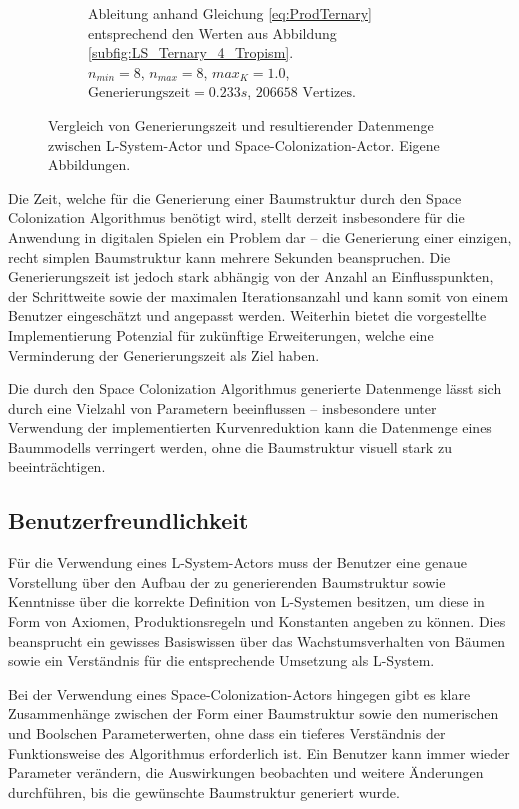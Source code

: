 \begin{figure} [hbtp]
\begin{subfigure}[t]{.5\textwidth}
		\caption{Ableitung anhand Gleichung \ref{eq:ProdTernary} entsprechend den Werten aus Abbildung \ref{subfig:LS_Ternary_4_Tropism}. \\ $n_{min} = 8$, $n_{max} = 8$, $max_K = 1.0$, \\ $\text{Generierungszeit}= 0.233s$, $206658 \text{ Vertizes}$.}
		\label{subfig:Performance_LS_Ternary_4_Tropism}
	\end{subfigure}	
	\caption{Vergleich von Generierungszeit und resultierender Datenmenge zwischen L-System-Actor und Space-Colonization-Actor. Eigene Abbildungen.}
	\label{fig:Results_ComparisonOfTime}
\end{figure}

Die Zeit, welche für die Generierung einer Baumstruktur durch den Space Colonization Algorithmus benötigt wird, stellt derzeit insbesondere für die Anwendung in digitalen Spielen ein Problem dar -- die Generierung einer einzigen, recht simplen Baumstruktur kann mehrere Sekunden beanspruchen. Die Generierungszeit ist jedoch stark abhängig von der Anzahl an Einflusspunkten, der Schrittweite sowie der maximalen Iterationsanzahl und kann somit von einem Benutzer eingeschätzt und angepasst werden. Weiterhin bietet die vorgestellte Implementierung Potenzial für zukünftige Erweiterungen, welche eine Verminderung der Generierungszeit als Ziel haben.

Die durch den Space Colonization Algorithmus generierte Datenmenge lässt sich durch eine Vielzahl von Parametern beeinflussen -- insbesondere unter Verwendung der implementierten Kurvenreduktion kann die Datenmenge eines Baummodells verringert werden, ohne die Baumstruktur visuell stark zu beeinträchtigen.

\subsection{Benutzerfreundlichkeit}

Für die Verwendung eines L-System-Actors muss der Benutzer eine genaue Vorstellung über den Aufbau der zu generierenden Baumstruktur sowie Kenntnisse über die korrekte Definition von L-Systemen besitzen, um diese in Form von Axiomen, Produktionsregeln und Konstanten angeben zu können. Dies beansprucht ein gewisses Basiswissen über das Wachstumsverhalten von Bäumen sowie ein Verständnis für die entsprechende Umsetzung als L-System. \cite[S.86]{Deussen:05}

Bei der Verwendung eines Space-Colonization-Actors hingegen gibt es klare Zusammenhänge zwischen der Form einer Baumstruktur sowie den numerischen und Boolschen Parameterwerten, ohne dass ein tieferes Verständnis der Funktionsweise des Algorithmus erforderlich ist. Ein Benutzer kann immer wieder Parameter verändern, die Auswirkungen beobachten und weitere Änderungen durchführen, bis die gewünschte Baumstruktur generiert wurde. 
 \cite[S.89]{Deussen:05}
 
